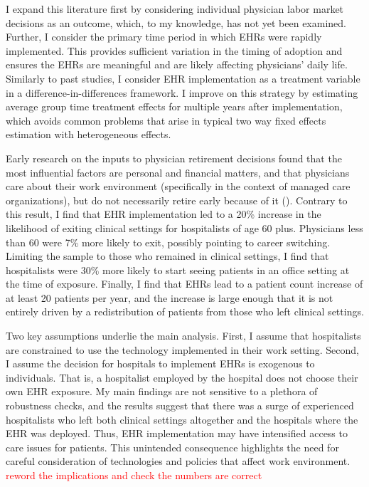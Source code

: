 \documentclass[12pt]{article}
\begin{document}
I expand this literature first by considering individual physician labor market decisions as an outcome, which, to my knowledge, has not yet been examined. Further, I consider the primary time period in which EHRs were rapidly implemented. This provides sufficient variation in the timing of adoption and ensures the EHRs are meaningful and are likely affecting physicians' daily life. Similarly to past studies, I consider EHR implementation as a treatment variable in a difference-in-differences framework. I improve on this strategy by estimating average group time treatment effects for multiple years after implementation, which avoids common problems that arise in typical two way fixed effects estimation with heterogeneous effects.  

Early research on the inputs to physician retirement decisions found that the most influential factors are personal and financial matters, and that physicians care about their work environment (specifically in the context of managed care organizations), but do not necessarily retire early because of it (\cite{Bahrami2002}). Contrary to this result, I find that EHR implementation led to a 20\% increase in the likelihood of exiting clinical settings for hospitalists of age 60 plus. Physicians less than 60 were 7\% more likely to exit, possibly pointing to career switching. Limiting the sample to those who remained in clinical settings, I find that hospitalists were 30\% more likely to start seeing patients in an office setting at the time of exposure. Finally, I find that EHRs lead to a patient count increase of at least 20 patients per year, and the increase is large enough that it is not entirely driven by a redistribution of patients from those who left clinical settings. 

Two key assumptions underlie the main analysis. First, I assume that hospitalists are constrained to use the technology implemented in their work setting. Second, I assume the decision for hospitals to implement EHRs is exogenous to individuals. That is, a hospitalist employed by the hospital does not choose their own EHR exposure. My main findings are not sensitive to a plethora of robustness checks, and the results suggest that there was a surge of experienced hospitalists who left both clinical settings altogether and the hospitals where the EHR was deployed. Thus, EHR implementation may have intensified access to care issues for patients. This unintended consequence highlights the need for careful consideration of technologies and policies that affect work environment.  \textcolor{red}{reword the implications and check the numbers are correct}
\end{document}

